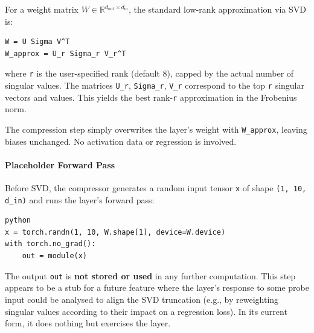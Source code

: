 For a weight matrix $W \in \mathbb{R}^{d_{\text{out}} \times d_{\text{in}}}$, the standard low-rank approximation via SVD is:

\vspace{0.5em}
\begin{mdframed}[backgroundcolor=codebg, linecolor=codeframe, linewidth=1pt, roundcorner=4pt, innerleftmargin=2pt, innerrightmargin=5pt, innertopmargin=5pt, innerbottommargin=5pt]
\begin{lstlisting}
W = U Sigma V^T
W_approx = U_r Sigma_r V_r^T
\end{lstlisting}
\end{mdframed}
\vspace{0.5em}

where \texttt{r} is the user-specified rank (default 8), capped by the actual number of singular values. The matrices \texttt{U\_r}, \texttt{Sigma\_r}, \texttt{V\_r} correspond to the top \texttt{r} singular vectors and values. This yields the best rank-\texttt{r} approximation in the Frobenius norm.

The compression step simply overwrites the layer's weight with \texttt{W\_approx}, leaving biases unchanged. No activation data or regression is involved.

\paragraph{Placeholder Forward Pass}

Before SVD, the compressor generates a random input tensor \texttt{x} of shape \texttt{(1, 10, d\_in)} and runs the layer's forward pass:

\vspace{0.5em}
\begin{mdframed}[backgroundcolor=codebg, linecolor=codeframe, linewidth=1pt, roundcorner=4pt, innerleftmargin=2pt, innerrightmargin=5pt, innertopmargin=5pt, innerbottommargin=5pt]
\begin{lstlisting}
python
x = torch.randn(1, 10, W.shape[1], device=W.device)
with torch.no_grad():
    out = module(x)
\end{lstlisting}
\end{mdframed}
\vspace{0.5em}

The output \texttt{out} is \textbf{not stored or used} in any further computation. This step appears to be a stub for a future feature where the layer's response to some probe input could be analysed to align the SVD truncation (e.g., by reweighting singular values according to their impact on a regression loss). In its current form, it does nothing but exercises the layer.

